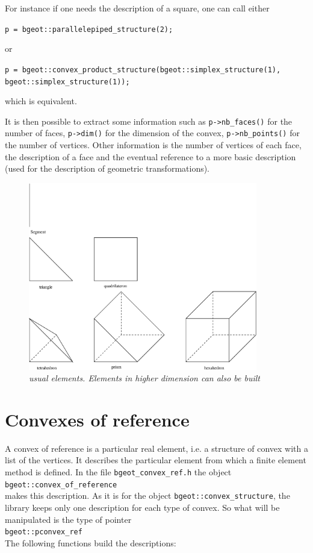 \documentclass[11pt,a4paper]{article}
\begin{document}
For instance if one needs the description of a square, one can call either

{\tt p = bgeot::parallelepiped\_structure(2); }

or

{\tt p = bgeot::convex\_product\_structure(bgeot::simplex\_structure(1),\\        \mbox{} \hspace{18.5em} bgeot::simplex\_structure(1)); }

which is equivalent.

It is then possible to extract some information such as {\tt p->nb\_faces()} for the number of faces, {\tt p->dim()} for the dimension of the convex, {\tt p->nb\_points()} for the number of vertices. Other information is the number of vertices of each face, the description of a face and the eventual reference to a more basic description (used for the description of geometric transformations).

\begin{figure}[htb]
  \begin{center}
    \includegraphics[width=10cm,angle=0]{getfemelem_elem.eps}
  \end{center}
  \caption{ \it usual elements. Elements in higher dimension can also be built }
  \label{fig:elem}
\end{figure}

\rcc

\section{Convexes of reference}

A convex of reference is a particular real element, i.e. a structure of convex with a list of the vertices. It describes the particular element from which a finite element method is defined. In the file {\tt bgeot\_convex\_ref.h} the object\\[0.5cm]
{\tt bgeot::convex\_of\_reference }\\[0.5cm]
makes this description. As it is for the object {\tt bgeot::convex\_structure}, the library keeps only one  description for each type of convex. So what will be manipulated is the type of pointer\\[0.5cm]
{\tt bgeot::pconvex\_ref }\\[0.5cm]
The following functions build the descriptions:
\end{document}

